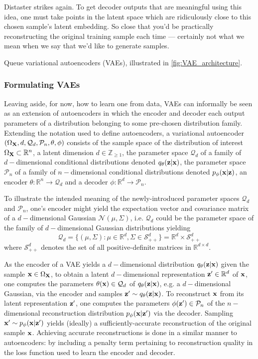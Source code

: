\documentclass[11pt]{article}
\begin{document}
\noindent Distaster strikes again. To get decoder outputs that are meaningful using this idea, one must take points in the latent space which are ridiculously close to this chosen sample's latent embedding. So close that you'd be practically reconstructing the original training sample each time — certainly not what we mean when we say that we'd like to generate samples.

Queue variational autoencoders (VAEs), illustrated in \autoref{fig:VAE_architecture}.

\subsubsection{Formulating VAEs}
Leaving aside, for now, how to learn one from data, VAEs can informally be seen as an extension of autoencoders in which the encoder and decoder each output parameters of a distribution belonging to some pre-chosen distribution family. Extending the notation used to define autoencoders, a variational autoencoder $(\Omega_{\mathbf{X}},d,\mathcal{Q}_d,\mathcal{P}_n,\theta,\phi)$ consists of the sample space of the distribution of interest $\Omega_{\mathbf{X}}\subset\mathbb{R}^n$, a latent dimension $d\in\mathbb{Z}_{\geq1}$, the parameter space $\mathcal{Q}_d$ of a family of $d-$dimensional conditional distributions denoted $q_{\theta}(\mathbf{z}|\mathbf{x})$, the parameter space $\mathcal{P}_n$ of a family of $n-$dimensional conditional distributions denoted $p_{\phi}(\mathbf{x}|\mathbf{z})$, an encoder $\theta:\mathbb{R}^n\to\mathcal{Q}_d$ and a decoder $\phi:\mathbb{R}^d\to\mathcal{P}_n$.

To illustrate the intended meaning of the newly-introduced parameter spaces $\mathcal{Q}_d$ and $\mathcal{P}_n$, one's encoder might yield the expectation vector and covariance matrix of a $d-$dimensional Gaussian $\mathcal{N}(\mu,\Sigma)$, i.e. $\mathcal{Q}_d$ could be the parameter space of the family of $d-$dimensional Gaussian distributions yielding
$$
\mathcal{Q}_d
=
\{
(\mu,\Sigma):\mu\in\mathbb{R}^d, \Sigma\in\mathcal{S}_{++}^d
\}
=
\mathbb{R}^d\times\mathcal{S}_{++}^d
$$
where $\mathcal{S}_{++}^d$ denotes the set of all positive-definite matrices in $\mathbb{R}^{d\times d}$.

As the encoder of a VAE yields a $d-$dimensional distribution $q_{\theta}(\mathbf{z}|\mathbf{x})$ given the sample $\mathbf{x}\in\Omega_{\mathbf{X}}$, to obtain a latent $d-$dimensional representation $\mathbf{z}'\in\mathbb{R}^d$ of $\mathbf{x}$, one computes the parameters $\theta(\mathbf{x})\in\mathcal{Q}_d$ of $q_{\theta}(\mathbf{z}|\mathbf{x})$, e.g. a $d-$dimensional Gaussian, via the encoder and samples $\mathbf{z}'\sim q_{\theta}(\mathbf{z}|\mathbf{x})$. To reconstruct $\mathbf{x}$ from its latent representation $\mathbf{z}'$, one computes the parameters $\phi(\mathbf{z}')\in\mathcal{P}_n$ of the $n-$dimensional reconstruction distribution $p_{\phi}(\mathbf{x}|\mathbf{z}')$ via the decoder. Sampling $\mathbf{x}'\sim p_{\phi}(\mathbf{x}|\mathbf{z}')$ yields (ideally) a sufficiently-accurate reconstruction of the original sample $\mathbf{x}$. Achieving accurate reconstructions is done in a similar manner to autoencoders: by including a penalty term pertaining to reconstruction quality in the loss function used to learn the encoder and decoder.
\end{document}
